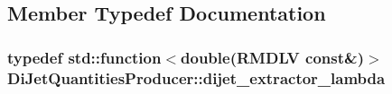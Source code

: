 \subsection{Member Typedef Documentation}
\hypertarget{classDiJetQuantitiesProducer_a08cdb9a72346178635bc116c04ef6271}{
\subsubsection[{dijet\_\-extractor\_\-lambda}]{\setlength{\rightskip}{0pt plus 5cm}typedef std::function$<$double(RMDLV const\&)$>$ {\bf DiJetQuantitiesProducer::dijet\_\-extractor\_\-lambda}}}
\label{classDiJetQuantitiesProducer_a08cdb9a72346178635bc116c04ef6271}


